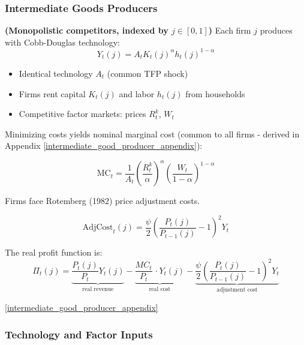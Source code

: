 \documentclass[11pt,preprint]{elsarticle}
\numberwithin{equation}{section}
\numberwithin{figure}{section}
\numberwithin{table}{section}
\def\tightlist{} %
\begin{document}
\subsubsection{Intermediate Goods
Producers}\label{intermediate-goods-producers}

\textbf{(Monopolistic competitors, indexed by \(j \in [0,1]\))} Each
firm \(j\) produces with Cobb-Douglas technology: \begin{equation}
Y_t(j) = A_t K_t(j)^{\alpha} h_t(j)^{1-\alpha}
\label{intermediate_production}
\end{equation}

\begin{itemize}
\tightlist
\item
  Identical technology \(A_t\) (common TFP shock)
\item
  Firms rent capital \(K_t(j)\) and labor \(h_t(j)\) from households
\item
  Competitive factor markets: prices \(R_t^k\), \(W_t\)
\end{itemize}

Minimizing costs yields nominal marginal cost (common to all firms -
derived in Appendix \ref{intermediate_good_producer_appendix}):

\begin{equation}
\text{MC}_t = \frac{1}{A_t} \left( \frac{R_t^k}{\alpha} \right)^{\alpha} \left( \frac{W_t}{1-\alpha} \right)^{1-\alpha}
\label{marginal_cost}
\end{equation}

Firms face Rotemberg (1982) price adjustment costs.

\[
\text{AdjCost}_t(j) = \frac{\psi}{2} \left( \frac{P_t(j)}{P_{t-1}(j)} - 1 \right)^2 Y_t
\]

The real profit function is: \begin{equation}
\Pi_t(j) = \underbrace{\frac{P_t(j)}{P_t} Y_t(j)}_{\text{real revenue}} - \underbrace{\frac{MC_t}{P_t}\,\cdot Y_t(j)}_{\text{real cost}} - \underbrace{\frac{\psi}{2} \left( \frac{P_t(j)}{P_{t-1}(j)} - 1 \right)^2 Y_t}_{\text{adjustment cost}}
\label{firm_profit}
\end{equation}

\ref{intermediate_good_producer_appendix}

\subsubsection{Technology and Factor
Inputs}\label{technology-and-factor-inputs}
\end{document}
